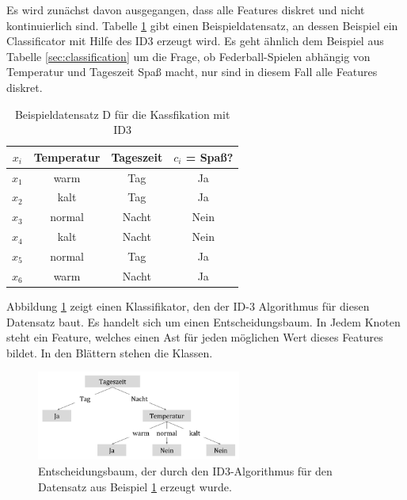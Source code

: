 Es wird zunächst davon ausgegangen, dass alle Features diskret und nicht kontinuierlich sind. Tabelle \ref{tab:id3_example} gibt einen Beispieldatensatz, an dessen Beispiel ein Classificator mit Hilfe des ID3 erzeugt wird. Es geht ähnlich dem Beispiel aus Tabelle \ref{sec:classification} um die Frage, ob Federball-Spielen abhängig von Temperatur und Tageszeit Spaß macht, nur sind in diesem Fall alle Features diskret. 

\begin{table}[h]
	\centering
	\caption{Beispieldatensatz D für die Kassfikation mit ID3}
	\label{tab:id3_example}
	\begin{tabular}{cccc}
		\toprule
		$x_i$    &Temperatur   & Tageszeit & $c_i$ = Spaß? \\\midrule
		$x_1$  & warm                & Tag          & Ja           \\
		$x_2$  & kalt                & Tag          & Ja           \\
		$x_3$  & normal                & Nacht          & Nein         \\
		$x_4$  & kalt                & Nacht          & Nein           \\
		$x_5$  & normal                & Tag         & Ja       \\
		$x_6$  & warm                & Nacht          & Ja       \\ \bottomrule  
	\end{tabular}
\end{table}

Abbildung \ref{img:id3tree} zeigt einen Klassifikator, den der ID-3 Algorithmus für diesen Datensatz baut. Es handelt sich um einen Entscheidungsbaum. In Jedem Knoten steht ein Feature, welches einen Ast für jeden möglichen Wert dieses Features bildet. In den Blättern stehen die Klassen.\cite[S. 134]{machine_marsland}

\begin{figure}[h]
	\centering
	\includegraphics[width=0.6\textwidth]{bilder/id3tree.png}
	\caption{Entscheidungsbaum, der durch den ID3-Algorithmus für den Datensatz aus Beispiel \ref{tab:id3_example} erzeugt wurde.}
	\label{img:id3tree}
\end{figure}

